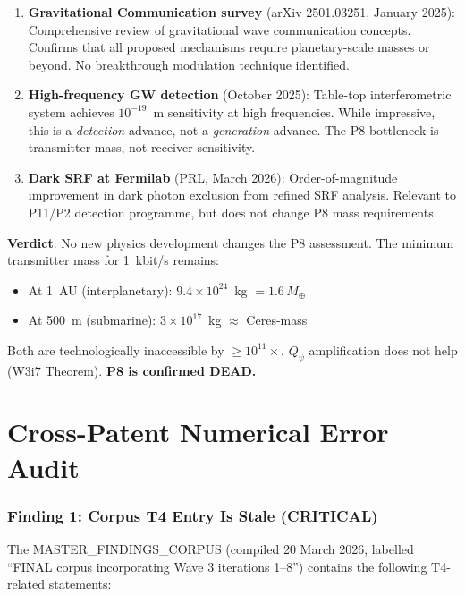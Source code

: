 \documentclass[11pt]{article}
\newcommand{\ee}[1]{\times 10^{#1}}
\begin{document}
\begin{enumerate}[nosep]
\item \textbf{Gravitational Communication survey} (arXiv 2501.03251,
  January 2025): Comprehensive review of gravitational wave
  communication concepts. Confirms that all proposed mechanisms require
  planetary-scale masses or beyond. No breakthrough modulation technique
  identified.

\item \textbf{High-frequency GW detection} (October 2025): Table-top
  interferometric system achieves $10^{-19}$~m sensitivity at high
  frequencies. While impressive, this is a \emph{detection} advance,
  not a \emph{generation} advance. The P8 bottleneck is transmitter
  mass, not receiver sensitivity.

\item \textbf{Dark SRF at Fermilab} (PRL, March 2026): Order-of-magnitude
  improvement in dark photon exclusion from refined SRF analysis. Relevant
  to P11/P2 detection programme, but does not change P8 mass requirements.
\end{enumerate}

\textbf{Verdict}: No new physics development changes the P8 assessment.
The minimum transmitter mass for 1~kbit/s remains:
\begin{itemize}[nosep]
\item At 1~AU (interplanetary): $9.4\ee{24}$~kg $= 1.6\,M_\oplus$
\item At 500~m (submarine): $3\ee{17}$~kg $\approx$ Ceres-mass
\end{itemize}
Both are technologically inaccessible by $\geq 10^{11}\times$.
$Q_\psi$ amplification does not help (W3i7 Theorem).
\textbf{P8 is confirmed DEAD.}


\part{Cross-Patent Numerical Error Audit}

\section{Finding 1: Corpus T4 Entry Is Stale (CRITICAL)}
\label{sec:T4-stale}

The MASTER\_FINDINGS\_CORPUS (compiled 20 March 2026, labelled ``FINAL
corpus incorporating Wave 3 iterations 1--8'') contains the following
T4-related statements:
\end{document}
